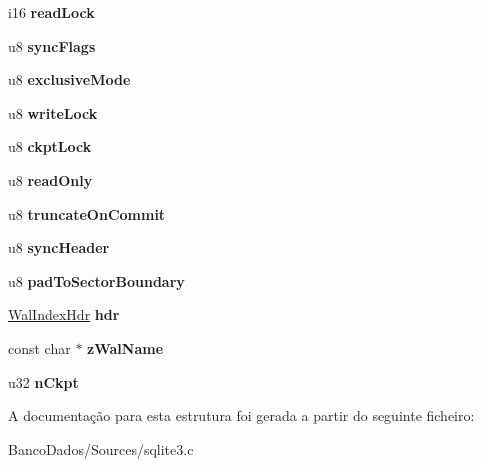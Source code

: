 \begin{DoxyCompactItemize}
\item 
\hypertarget{struct_wal_a260550c859ac7224fbdad0586dca664a}{i16 {\bfseries read\-Lock}}\label{struct_wal_a260550c859ac7224fbdad0586dca664a}

\item 
\hypertarget{struct_wal_ac1382875f5fe049ccf09f1c2d370c429}{u8 {\bfseries sync\-Flags}}\label{struct_wal_ac1382875f5fe049ccf09f1c2d370c429}

\item 
\hypertarget{struct_wal_ada255c96ca65d9d8955bbf139af4e6f4}{u8 {\bfseries exclusive\-Mode}}\label{struct_wal_ada255c96ca65d9d8955bbf139af4e6f4}

\item 
\hypertarget{struct_wal_ad7f4ba84f07115b7ce3a6133479c9d24}{u8 {\bfseries write\-Lock}}\label{struct_wal_ad7f4ba84f07115b7ce3a6133479c9d24}

\item 
\hypertarget{struct_wal_a29153bfb37a9a32f1171e5c1d10994d2}{u8 {\bfseries ckpt\-Lock}}\label{struct_wal_a29153bfb37a9a32f1171e5c1d10994d2}

\item 
\hypertarget{struct_wal_a38f0810e34bdc89acdf27574473c0495}{u8 {\bfseries read\-Only}}\label{struct_wal_a38f0810e34bdc89acdf27574473c0495}

\item 
\hypertarget{struct_wal_a12870bbe7755271c94c3eb1fd0280c56}{u8 {\bfseries truncate\-On\-Commit}}\label{struct_wal_a12870bbe7755271c94c3eb1fd0280c56}

\item 
\hypertarget{struct_wal_ae3de9666170c103a835a2c767932d3f9}{u8 {\bfseries sync\-Header}}\label{struct_wal_ae3de9666170c103a835a2c767932d3f9}

\item 
\hypertarget{struct_wal_af10e79ca8fe617d7df706182ebdf7039}{u8 {\bfseries pad\-To\-Sector\-Boundary}}\label{struct_wal_af10e79ca8fe617d7df706182ebdf7039}

\item 
\hypertarget{struct_wal_adbeef9e632541fbf07c926652b165906}{\hyperlink{struct_wal_index_hdr}{Wal\-Index\-Hdr} {\bfseries hdr}}\label{struct_wal_adbeef9e632541fbf07c926652b165906}

\item 
\hypertarget{struct_wal_ac54961758701702d67eaf3ce15c69ea5}{const char $\ast$ {\bfseries z\-Wal\-Name}}\label{struct_wal_ac54961758701702d67eaf3ce15c69ea5}

\item 
\hypertarget{struct_wal_a8fbe9b014342db76d8167b518b70acad}{u32 {\bfseries n\-Ckpt}}\label{struct_wal_a8fbe9b014342db76d8167b518b70acad}

\end{DoxyCompactItemize}


A documentação para esta estrutura foi gerada a partir do seguinte ficheiro\-:\begin{DoxyCompactItemize}
\item 
Banco\-Dados/\-Sources/sqlite3.\-c\end{DoxyCompactItemize}

